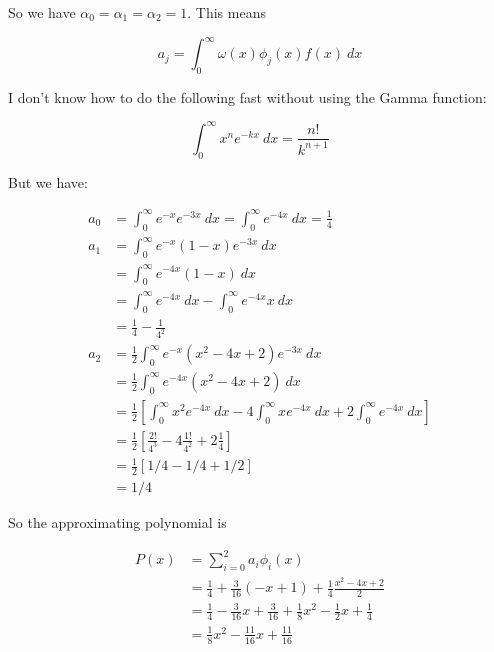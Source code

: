 \documentclass[12pt]{article}
\theoremstyle{definition}
\begin{document}
So we have $\alpha_0 = \alpha_1 = \alpha_2 =1$. This means 

\begin{equation*}
    a_j = \int_0^\infty \omega(x) \phi_j(x) f(x) ~ dx
\end{equation*}

I don't know how to do the following fast without using the Gamma function:

\begin{equation*}
    \int_0^\infty x^n e^{-kx} ~ dx = \frac{n!}{k^{n+1}}
\end{equation*}

But we have:

\begin{align*}
    a_0 &= \int_0^\infty e^{-x} e^{-3x} ~ dx = \int_0^\infty e^{-4x} ~ dx =
    \frac{1}{4} \\ 
    a_1 &= \int_0^\infty e^{-x}(1-x) e^{-3x} ~ dx \\ 
        &= \int_0^\infty e^{-4x}(1-x) ~ dx \\ 
        &=\int_0^\infty e^{-4x} ~ dx- \int_0^\infty e^{-4x} x ~ dx \\ 
        &= \frac{1}{4} - \frac{1}{4^2} \\ 
    a_2 &= \frac{1}{2}\int_0^\infty e^{-x} (x^2 - 4x + 2)e^{-3x} ~ dx \\ 
        &= \frac{1}{2} \int_0^\infty e^{-4x}(x^2 -4x + 2) ~ dx \\ 
        &= \frac{1}{2}\left[ \int_0^\infty x^2 e^{-4x} ~ dx - 4 \int_0^\infty
        xe^{-4x} ~ dx + 2 \int_0^\infty e^{-4x} ~ dx \right]  \\ 
        &=\frac{1}{2}\left[ \frac{2!}{4^3} - 4 \frac{1!}{4^2} + 2 \frac{1}{4}
        \right]  \\ 
        &=\frac{1}{2}\left[ 1 / 4 - 1 / 4 + 1 / 2 \right]  \\
        &= 1 / 4
\end{align*}

So the approximating polynomial is

\begin{align*}
    P(x) 
    &= \sum_{i=0}^2 a_i \phi_i(x) \\
    &= \frac{1}{4} + \frac{3}{16}(-x+1) + \frac{1}{4}\frac{x^2 -4x + 2}{2} \\ 
    &=\frac{1}{4} - \frac{3}{16}x + \frac{3}{16} + \frac{1}{8}x^2 - \frac{1}{2}x
    + \frac{1}{4} \\ 
    &=\frac{1}{8}x^2 - \frac{11}{16}x + \frac{11}{16}
\end{align*}
\end{document}
